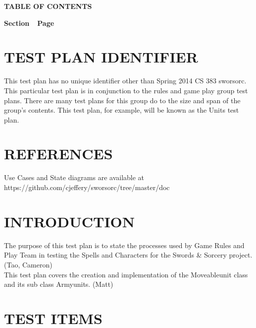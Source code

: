 {\centering{}\bfseries\color{black}
TABLE OF CONTENTS
\par}

{\bfseries\color{black}
Section\ \ Page}

\setcounter{tocdepth}{9}
\renewcommand\contentsname{}
\tableofcontents

\setcounter{page}{1}\pagestyle{Convertiv}

\section[IDENTIFIER]{\bfseries\color{black} TEST PLAN IDENTIFIER}

{\color{black}
This test plan has no unique identifier other than Spring 2014 CS 383 sworsorc. This particular test plan is in conjunction to the rules and game play group test plans. There are many test plans for this group do to the size and span of the group's contents. This test plan, for example, will be known as the Units test plan.}

\section[REFERENCES]{\bfseries\color{black}
REFERENCES}

{\color{black}
Use Cases and State diagrams are available at https://github.com/cjeffery/sworsorc/tree/master/doc }


\section[INTRODUCTION]{\bfseries\color{black} INTRODUCTION}

{\color{black}
The purpose of this test plan is to state the processes used by Game Rules and Play Team in testing the Spells and Characters for the Swords \& Sorcery project.(Tao, Cameron)
\\
This test plan covers the creation and implementation of the Moveableunit class and its sub class Armyunits. (Matt)


}

\section[TEST ITEMS]{\bfseries\color{black} TEST ITEMS}

